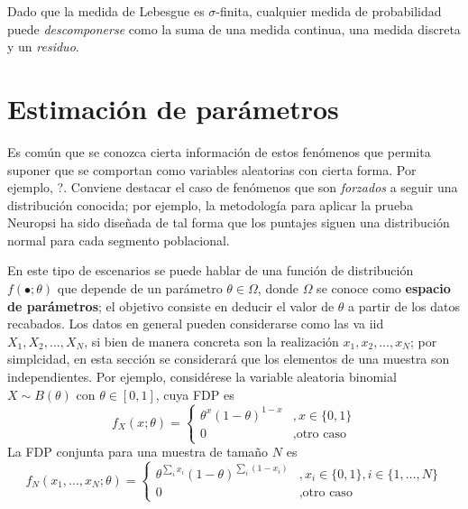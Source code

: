Dado que la medida de Lebesgue es $\sigma$-finita, cualquier medida de probabilidad puede 
\textit{descomponerse} como la suma de una medida continua, una medida discreta y un \textit{residuo}.


\section{Estimación de parámetros}

Es común que se conozca cierta información de estos fenómenos que permita suponer que se comportan como variables aleatorias con cierta forma. Por ejemplo, ?.%
%
Conviene destacar el caso de fenómenos que son \textit{forzados} a seguir una distribución conocida; por ejemplo, la metodología para aplicar la prueba Neuropsi \cite{Ostrosky00} ha sido diseñada de tal forma que los puntajes siguen una distribución normal para cada segmento poblacional.

En este tipo de escenarios se puede hablar de una función de distribución $f(\bullet; \theta)$ que depende de un parámetro $\theta \in \Omega$, donde $\Omega$ se conoce como \textbf{espacio de parámetros}; el objetivo consiste en deducir el valor de $\theta$ a partir de los datos recabados.
%
Los datos en general pueden considerarse como las va iid $X_1, X_2, \dots, X_N$, si bien de manera concreta son la realización $x_1, x_2, \dots, x_N$; por simplcidad, en esta sección se considerará que los elementos de una muestra son independientes.
%
Por ejemplo, considérese la variable aleatoria binomial $X \sim B(\theta)$ con $\theta \in [0, 1]$, cuya FDP es
\begin{equation}
f_X(x; \theta) = \begin{cases}
\theta^{x} (1-\theta)^{1-x} &, x\in \{ 0,1 \} \\
0 &, \text{otro caso}
\end{cases}
\end{equation}
La FDP conjunta para una muestra de tamaño $N$ es
\begin{equation}
f_N(x_1, \dots, x_N; \theta) = 
\begin{cases}
\theta^{\sum_i x_i}(1-\theta)^{\sum_i(1-x_i)} &, x_i \in \{ 0,1 \}, i\in \{1, \dots, N\} \\
0 &, \text{otro caso}
\end{cases}
\end{equation}

